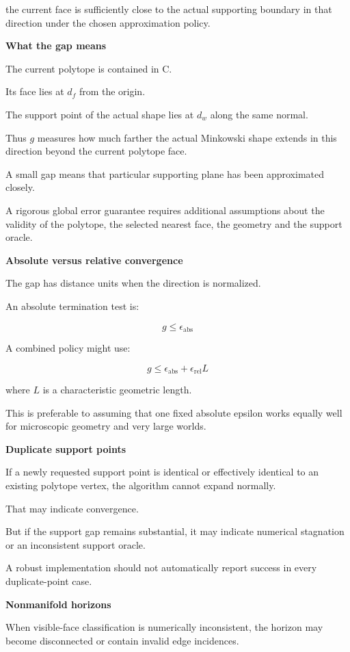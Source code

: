 the current face is sufficiently close to the actual supporting boundary in that direction under the chosen approximation policy.

\textbf{What the gap means}

The current polytope is contained in C.

Its face lies at \(d_f\) from the origin.

The support point of the actual shape lies at \(d_w\) along the same normal.

Thus \(g\) measures how much farther the actual Minkowski shape extends in this direction beyond the current polytope face.

A small gap means that particular supporting plane has been approximated closely.

A rigorous global error guarantee requires additional assumptions about the validity of the polytope, the selected nearest face, the geometry and the support oracle.

\textbf{Absolute versus relative convergence}

The gap has distance units when the direction is normalized.

An absolute termination test is:

\[
g\le\epsilon_{\mathrm{abs}}
\]

A combined policy might use:

\[
\boxed{ g\le\epsilon_{\mathrm{abs}} + \epsilon_{\mathrm{rel}}L }
\]

where \(L\) is a characteristic geometric length.

This is preferable to assuming that one fixed absolute epsilon works equally well for microscopic geometry and very large worlds.

\textbf{Duplicate support points}

If a newly requested support point is identical or effectively identical to an existing polytope vertex, the algorithm cannot expand normally.

That may indicate convergence.

But if the support gap remains substantial, it may indicate numerical stagnation or an inconsistent support oracle.

A robust implementation should not automatically report success in every duplicate-point case.

\textbf{Nonmanifold horizons}

When visible-face classification is numerically inconsistent, the horizon may become disconnected or contain invalid edge incidences.

